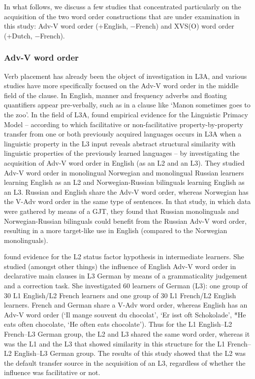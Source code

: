\documentclass[output=paper,modfonts,nonflat, newtxmath]{langsci/langscibook}
\begin{document}
In what follows, we discuss a few studies that concentrated particularly on the acquisition of the two word order constructions that are under examination in this study: Adv-V word order (+English, $-$French) and XVS(O) word order (+Dutch, $-$French).

\subsubsection{{Adv-V} {word} {order}}%
\label{sec:stadt:2.2.1}

Verb placement has already been the object of investigation in L3A, and various studies have more specifically focused on the Adv-V word order in the middle field of the clause. In English, manner and frequency adverbs and floating quantifiers appear pre-verbally, such as in a clause like ‘Manon sometimes goes to the zoo’. In the field of L3A, \citet{WestergaardEtAl2016} found empirical evidence for the Linguistic Primacy Model – according to which facilitative or non-facilitative property-by-property transfer from one or both previously acquired languages occurs in L3A when a linguistic property in the L3 input reveals abstract structural similarity with linguistic properties of the previously learned languages – by investigating the acquisition of Adv-V word order in English (as an L2 and an L3). They studied Adv-V word order in monolingual Norwegian and monolingual Russian learners learning English as an L2 and Norwegian-Russian bilinguals learning English as an L3. Russian and English share the Adv-V word order, whereas Norwegian has the V-Adv word order in the same type of sentences. In that study, in which data were gathered by means of a GJT, they found that Russian monolinguals and Norwegian-Russian bilinguals could benefit from the Russian Adv-V word order, resulting in a more target-like use in English (compared to the Norwegian monolinguals).

  \citet{Falk2010} found evidence for the L2 status factor hypothesis in intermediate learners. She studied (amongst other things) the influence of English Adv-V word order in declarative main clauses in L3 German by means of a grammaticality judgement and a correction task. She investigated 60 learners of German (L3): one group of 30 L1 English/L2 French learners and one group of 30 L1 French/L2 English learners. French and German share a V-Adv word order, whereas English has an Adv-V word order (‘Il mange souvent du chocolat’, ‘Er isst oft Schokolade’, *He eats often chocolate, ‘He often eats chocolate’). Thus for the L1 English–L2 French–L3 German group, the L2 and L3 shared the same word order, whereas it was the L1 and the L3 that showed similarity in this structure for the L1 French–L2 English–L3 German group. The results of this study showed that the L2 was the default transfer source in the acquisition of an L3, regardless of whether the influence was facilitative or not.
\end{document}
